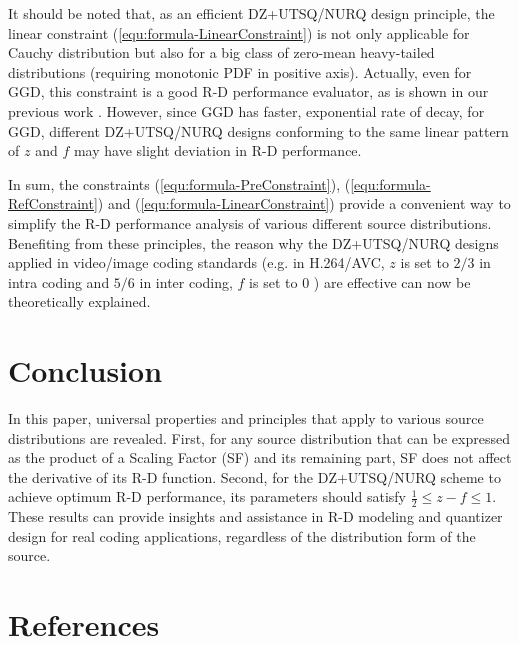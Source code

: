 \documentclass[smallabstract,smallcaptions]{dccpaper}
\begin{document}
It should be noted that, as an efficient DZ+UTSQ/NURQ design principle, the linear constraint (\ref{equ:formula-LinearConstraint}) is not only applicable for Cauchy distribution but also for a big class of zero-mean heavy-tailed distributions (requiring monotonic PDF in positive axis). Actually, even for GGD, this constraint is a good R-D performance evaluator, as is shown in our previous work \cite{Sun_TIP2013}. However, since GGD has faster, exponential rate of decay, for GGD, different DZ+UTSQ/NURQ designs conforming to the same linear pattern of $z$ and $f$ may have slight deviation in R-D performance. 

In sum, the constraints (\ref{equ:formula-PreConstraint}), (\ref{equ:formula-RefConstraint}) and (\ref{equ:formula-LinearConstraint}) provide a convenient way to simplify the R-D performance analysis of various different source distributions. Benefiting from these principles, the reason why the DZ+UTSQ/NURQ designs applied in video/image coding standards (e.g. in H.264/AVC, $z$ is set to $2/3$ in intra coding and $5/6$ in inter coding, $f$ is set to $0$ \cite{Sullivan_VCIP2005}) are effective can now be theoretically explained.

\section{Conclusion}
\label{sec:conclusion}

In this paper, universal properties and principles that apply to various source distributions are revealed. First, for any source distribution that can be expressed as the product of a Scaling Factor (SF) and its remaining part, SF does not affect the derivative of its R-D function. Second, for the DZ+UTSQ/NURQ scheme to achieve optimum R-D performance, its parameters should satisfy $\frac{1}{2} \le z - f \le 1$. These results can provide insights and assistance in R-D modeling and quantizer design for real coding applications, regardless of the distribution form of the source. 

\section*{References}


\end{document}
